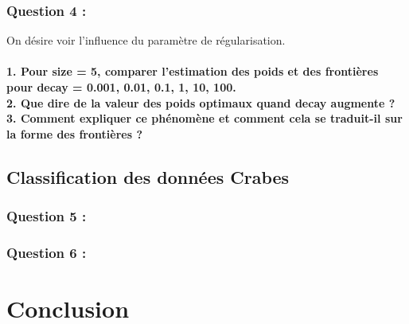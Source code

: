 \documentclass[a4paper, 10pt]{article}
\begin{document}
\subsubsection*{Question 4 :}

On désire voir l'influence du paramètre de régularisation.\\ \\

\textbf{1. Pour size = 5, comparer l'estimation des poids et des frontières pour decay = 0.001, 0.01, 0.1, 1, 10, 100.}\\
\textbf{2. Que dire de la valeur des poids optimaux quand decay augmente ?}\\
\textbf{3. Comment expliquer ce phénomène et comment cela se traduit-il sur la forme des frontières ?}\\

\subsection*{Classification des données Crabes}

\subsubsection*{Question 5 :}

\subsubsection*{Question 6 :}

\section*{Conclusion}
\end{document}
